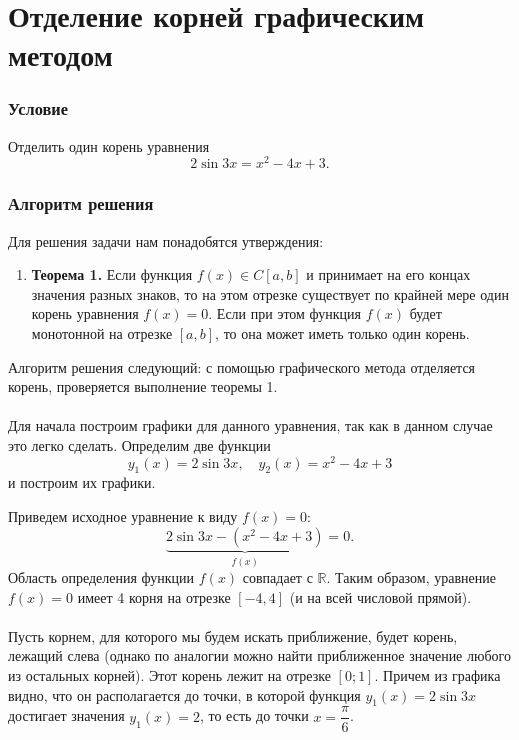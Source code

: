 \documentclass[a4paper, 12pt]{article}
\newcommand{\Rm}{\mathbb{R}}
\begin{document}
	\section*{Отделение корней графическим методом}
	\subsubsection*{Условие}
	Отделить один корень уравнения $$2\sin3x = x^2 - 4x + 3.$$
	\subsubsection*{Алгоритм решения}
	Для решения задачи нам понадобятся утверждения:
	\begin{enumerate}
		\item \textbf{Теорема 1.} Если функция $f(x)\in C[a,b]$ и принимает на его концах значения разных знаков, то на этом отрезке существует по крайней мере один корень уравнения $f(x) = 0$.
			Если при этом функция $f(x)$ будет монотонной на отрезке $[a,b]$, то она может иметь только один корень.
	\end{enumerate}
	Алгоритм решения следующий: с помощью графического метода отделяется корень, проверяется выполнение теоремы 1.\\\\
	Для начала построим графики для данного уравнения, так как в данном случае это легко сделать. Определим две функции $$y_1(x) = 2\sin 3x,\quad y_2(x) = x^2 - 4x+3$$ и построим их графики.
	\begin{center}\end{center}
	Приведем исходное уравнение к виду $f(x) = 0$: $$\underbrace{2\sin 3x - (x^2 - 4x+3)}_{f(x)} = 0.$$
	Область определения функции $f(x)$ совпадает с $\Rm$.
	Таким образом, уравнение $f(x)=0$ имеет 4 корня на отрезке $[-4,4]$ (и на всей числовой прямой). \\\\
	Пусть корнем, для которого мы будем искать приближение, будет корень, лежащий слева (однако по аналогии можно найти приближенное значение любого из остальных корней). Этот корень лежит на отрезке $[0; 1]$. Причем из графика видно, что он располагается до точки, в которой функция $y_1(x) = 2\sin3x$ достигает значения $y_1(x) = 2$, то есть до точки $x = \dfrac\pi6$.
\end{document}
